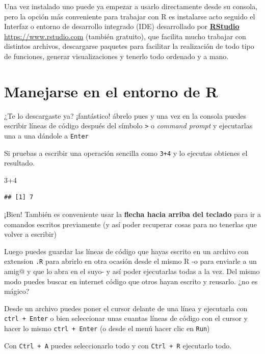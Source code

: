 \documentclass[]{book}
\newenvironment{Shaded}{\begin{snugshade}}{\end{snugshade}}
\newcommand{\DecValTok}[1]{\textcolor[rgb]{0.00,0.00,0.81}{{#1}}}
\theoremstyle{definition}
\theoremstyle{definition}
\theoremstyle{remark}
\begin{document}
Una vez instalado uno puede ya empezar a usarlo directamente desde su
consola, pero la opción más conveniente para trabajar con R es
instalarse acto seguido el Interfaz o entorno de desarrollo integrado
(IDE) desarrollado por \href{https://www.rstudio.com}{\textbf{RStudio}}
\url{https://www.rstudio.com} (también gratuito), que facilita mucho
trabajar con distintos archivos, descargarse paquetes para facilitar la
realización de todo tipo de funciones, generar visualizaciones y tenerlo
todo ordenado y a mano.

\section{Manejarse en el entorno de
R}\label{manejarse-en-el-entorno-de-r}

¿Te lo descargaste ya? ¡fantástico! ábrelo pues y una vez en la consola
puedes escribir líneas de código después del símbolo
\texttt{\textgreater{}} o \emph{command prompt} y ejecutarlas una a una
dándole a \texttt{Enter}

Si pruebas a escribir una operación sencilla como \texttt{3+4} y lo
ejecutas obtienes el resultado.

\begin{Shaded}
\begin{Highlighting}[]
\DecValTok{3+4}
\end{Highlighting}
\end{Shaded}

\begin{verbatim}
## [1] 7
\end{verbatim}

¡Bien! También es conveniente usar la \textbf{flecha hacia arriba del
teclado} para ir a comandos escritos previamente (y así poder recuperar
cosas para no tenerlas que volver a escribir)

Luego puedes guardar las líneas de código que hayas escrito en un
archivo con extension \texttt{.R} para abrirlo en otra ocasión desde el
mismo R -o para enviarle a un amig@ y que lo abra en el suyo- y así
poder ejecutarlas todas a la vez. Del mismo modo puedes buscar en
internet código que otros hayan escrito y reusarlo. ¿no es mágico?

Desde un archivo puedes poner el cursor delante de una línea y
ejecutarla con \texttt{ctrl\ +\ Enter} o bien seleccionar unas cuantas
líneas de código con el cursor y hacer lo mismo \texttt{ctrl\ +\ Enter}
(o desde el menú hacer clic en \texttt{Run})

Con \texttt{Ctrl\ +\ A} puedes seleccionarlo todo y con
\texttt{Ctrl\ +\ R} ejecutarlo todo.
\end{document}
